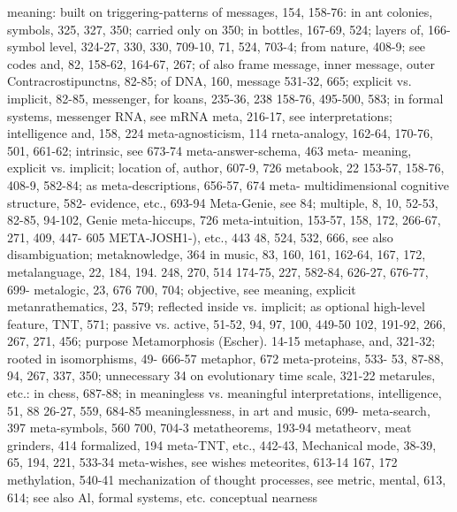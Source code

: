 meaning: built on triggering-patterns of        messages, 154, 158-76: in ant colonies,
symbols, 325, 327, 350; carried only on         350; in bottles, 167-69, 524; layers of, 166-
symbol level, 324-27, 330, 330, 709-10,         71, 524, 703-4; from nature, 408-9; see
codes and, 82, 158-62, 164-67, 267; of          also frame message, inner message, outer
Contracrostipunctns, 82-85; of DNA, 160,        message
531-32, 665; explicit vs. implicit, 82-85,      messenger, for koans, 235-36, 238
158-76, 495-500, 583; in formal systems,        messenger RNA, see mRNA meta, 216-17,
see interpretations; intelligence and, 158,     224 meta-agnosticism, 114 rneta-analogy,
162-64, 170-76, 501, 661-62; intrinsic, see     673-74 meta-answer-schema, 463 meta-
meaning, explicit vs. implicit; location of,    author, 607-9, 726 metabook, 22
153-57, 158-76, 408-9, 582-84; as               meta-descriptions, 656-57, 674 meta-
multidimensional cognitive structure, 582-      evidence, etc., 693-94 Meta-Genie, see
84; multiple, 8, 10, 52-53, 82-85, 94-102,      Genie meta-hiccups, 726 meta-intuition,
153-57, 158, 172, 266-67, 271, 409, 447-        605      META-JOSH1-),          etc.,     443
48, 524, 532, 666, see also disambiguation;     metaknowledge, 364
in music, 83, 160, 161, 162-64, 167, 172,       metalanguage, 22, 184, 194. 248, 270, 514
174-75, 227, 582-84, 626-27, 676-77, 699-       metalogic, 23, 676
700, 704; objective, see meaning, explicit      metanrathematics, 23, 579; reflected inside
vs. implicit; as optional high-level feature,   TNT,
571; passive vs. active, 51-52, 94, 97, 100,    449-50
102, 191-92, 266, 267, 271, 456; purpose        Metamorphosis (Escher). 14-15 metaphase,
and, 321-32; rooted in isomorphisms, 49-        666-57 metaphor, 672 meta-proteins, 533-
53, 87-88, 94, 267, 337, 350; unnecessary       34
on evolutionary time scale, 321-22              metarules, etc.: in chess, 687-88; in
meaningless vs. meaningful interpretations,     intelligence,
51, 88                                          26-27, 559, 684-85
meaninglessness, in art and music, 699-         meta-search, 397 meta-symbols, 560
700, 704-3                                      metatheorems,        193-94      metatheorv,
meat grinders, 414                              formalized, 194 meta-TNT, etc., 442-43,
Mechanical mode, 38-39, 65, 194, 221,           533-34 meta-wishes, see wishes meteorites,
613-14                                          167, 172 methylation, 540-41
mechanization of thought processes, see         metric, mental, 613, 614; see also
Al, formal systems, etc.                        conceptual nearness
